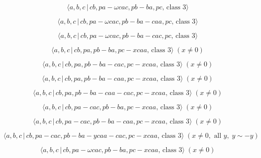 \documentclass[10pt]{article}
\begin{document}
\begin{equation}
\langle a,b,c\,|\,cb,pa-\omega cac,pb-ba,pc,\,\text{class }3\rangle 
\tag{7.843}
\end{equation}

\begin{equation}
\langle a,b,c\,|\,cb,pa-\omega cac,pb-ba-caa,pc,\,\text{class }3\rangle 
\tag{7.844}
\end{equation}

\begin{equation}
\langle a,b,c\,|\,cb,pa-\omega cac,pb-ba-cac,pc,\,\text{class }3\rangle 
\tag{7.845}
\end{equation}

\begin{equation}
\langle a,b,c\,|\,cb,pa,pb-ba,pc-xcaa,\,\text{class }3\rangle \;(x \neq 0) 
\tag{7.846}
\end{equation}

\begin{equation}
\langle a,b,c\,|\,cb,pa,pb-ba-cac,pc-xcaa,\,\text{class }3\rangle \;(x \neq
0)  \tag{7.847}
\end{equation}

\begin{equation}
\langle a,b,c\,|\,cb,pa,pb-ba-caa,pc-xcaa,\,\text{class }3\rangle \;(x \neq
0)  \tag{7.848}
\end{equation}

\begin{equation}
\langle a,b,c\,|\,cb,pa,pb-ba-caa-cac,pc-xcaa,\,\text{class }3\rangle \;(x
\neq 0)  \tag{7.849}
\end{equation}

\begin{equation}
\langle a,b,c\,|\,cb,pa-cac,pb-ba,pc-xcaa,\,\text{class }3\rangle \;(x \neq
0)  \tag{7.850}
\end{equation}

\begin{equation}
\langle a,b,c\,|\,cb,pa-cac,pb-ba-caa,pc-xcaa,\,\text{class }3\rangle \;(x
\neq 0)  \tag{7.851}
\end{equation}

\begin{equation}
\langle a,b,c\,|\,cb,pa-cac,pb-ba-ycaa-cac,pc-xcaa,\,\text{class }3\rangle
\;(x\neq 0,\text{ all }y,\;y\sim -y)  \tag{7.852}
\end{equation}

\begin{equation}
\langle a,b,c\,|\,cb,pa-\omega cac,pb-ba,pc-xcaa,\,\text{class }3\rangle
\;(x\neq 0)  \tag{7.853}
\end{equation}
\end{document}
